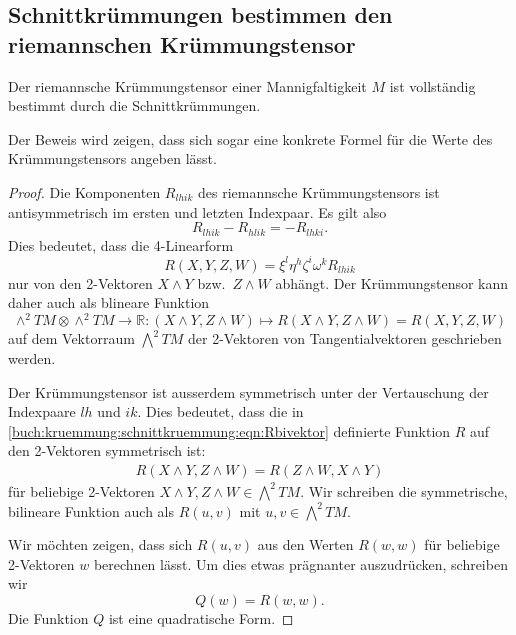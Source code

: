 \subsection{Schnittkrümmungen bestimmen den riemannschen Krümmungstensor}

\begin{satz}
Der riemannsche Krümmungstensor einer Mannigfaltigkeit $M$
ist vollständig bestimmt durch die Schnittkrümmungen.
\end{satz}

Der Beweis wird zeigen, dass sich sogar eine konkrete Formel
für die Werte des Krümmungstensors angeben lässt.

\begin{proof}
Die Komponenten $R_{lhik}$ des riemannsche Krümmungstensors ist
antisymmetrisch im ersten und letzten Indexpaar.
Es gilt also
\[
R_{lhik}
-R_{hlik}
=
-R_{lhki}.
\]
Dies bedeutet, dass die 4-Linearform
\[
R(X,Y,Z,W)
=
\xi^l\eta^h\zeta^i\omega^k R_{lhik}
\]
nur von den 2-Vektoren $X\wedge Y$ bzw.~$Z\wedge W$ abhängt.
Der Krümmungstensor kann daher auch als blineare Funktion
\begin{equation}
\wedge^2 TM\otimes\wedge^2 TM
\to
\mathbb{R}
:
(X\wedge Y,Z\wedge W)
\mapsto
R(X\wedge Y, Z\wedge W)
=
R(X,Y,Z,W)
\label{buch:kruemmung:schnittkruemmung:eqn:Rbivektor}
\end{equation}
auf dem Vektorraum $\bigwedge^2 TM$ der 2-Vektoren von Tangentialvektoren
geschrieben werden.

Der Krümmungstensor ist ausserdem symmetrisch unter der Vertauschung
der Indexpaare $lh$ und $ik$.
Dies bedeutet, dass die
in
\eqref{buch:kruemmung:schnittkruemmung:eqn:Rbivektor}
definierte Funktion $R$ auf den 2-Vektoren symmetrisch ist:
\begin{align*}
R(X\wedge Y,Z\wedge W)
=
R(Z\wedge W,X\wedge Y)
\end{align*}
für beliebige 2-Vektoren $X\wedge Y,Z\wedge W\in\bigwedge^2TM$.
Wir schreiben die symmetrische, bilineare Funktion auch als $R(u,v)$ mit
$u,v\in\bigwedge^2 TM$.

Wir möchten zeigen, dass sich $R(u,v)$ aus den Werten $R(w,w)$ für beliebige
2-Vektoren $w$ berechnen lässt.
Um dies etwas prägnanter auszudrücken, schreiben wir
\[
Q(w) = R(w,w).
\]
Die Funktion $Q$ ist eine quadratische Form.


\end{proof}
